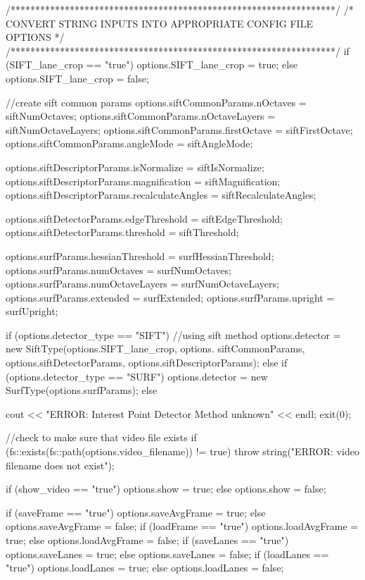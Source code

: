 \begin{DoxyCode}
{    /******************************************************************/
    /* CONVERT STRING INPUTS INTO APPROPRIATE CONFIG FILE OPTIONS */
    /******************************************************************/
    if (SIFT_lane_crop == "true")
        options.SIFT_lane_crop = true;
    else
        options.SIFT_lane_crop = false;


    //create sift common params
    options.siftCommonParams.nOctaves = siftNumOctaves;
    options.siftCommonParams.nOctaveLayers = siftNumOctaveLayers;
    options.siftCommonParams.firstOctave = siftFirstOctave;
    options.siftCommonParams.angleMode = siftAngleMode;

    options.siftDescriptorParams.isNormalize = siftIsNormalize;
    options.siftDescriptorParams.magnification = siftMagnification;
    options.siftDescriptorParams.recalculateAngles = siftRecalculateAngles;

    options.siftDetectorParams.edgeThreshold = siftEdgeThreshold;
    options.siftDetectorParams.threshold = siftThreshold;

    options.surfParams.hessianThreshold = surfHessianThreshold;
    options.surfParams.numOctaves = surfNumOctaves;
    options.surfParams.numOctaveLayers = surfNumOctaveLayers;
    options.surfParams.extended = surfExtended;
    options.surfParams.upright = surfUpright;


    if (options.detector_type == "SIFT") { //using sift method
        options.detector = new SiftType(options.SIFT_lane_crop, options.
      siftCommonParams, options.siftDetectorParams, options.siftDescriptorParams);
    } else if (options.detector_type == "SURF") {
        options.detector = new SurfType(options.surfParams);
    } else {
        cout << "ERROR: Interest Point Detector Method unknown" << endl;
        exit(0);

    }


    //check to make sure that video file exists
    if (fs::exists(fs::path(options.video_filename)) != true) {
        throw string("ERROR: video filename does not exist");
    }

    if (show_video == "true")
        options.show = true;
    else
        options.show = false;


    if (saveFrame == "true") options.saveAvgFrame = true;
    else options.saveAvgFrame = false;
    if (loadFrame == "true") options.loadAvgFrame = true;
    else options.loadAvgFrame = false;
    if (saveLanes == "true") options.saveLanes = true;
    else options.saveLanes = false;
    if (loadLanes == "true") options.loadLanes = true;
    else options.loadLanes = false;

}
\end{DoxyCode}
